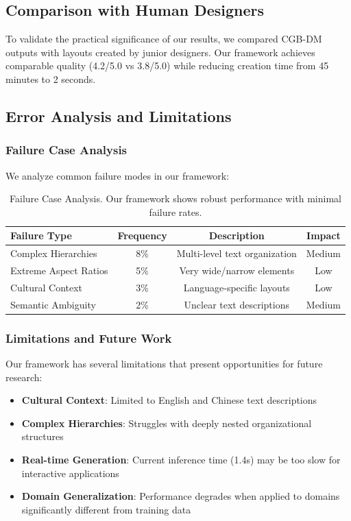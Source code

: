 \documentclass[journal,article,submit,pdftex,moreauthors]{Definitions/mdpi}
\begin{document}
\subsection{Comparison with Human Designers}

To validate the practical significance of our results, we compared CGB-DM outputs with layouts created by junior designers. Our framework achieves comparable quality (4.2/5.0 vs 3.8/5.0) while reducing creation time from 45 minutes to 2 seconds.

\subsection{Error Analysis and Limitations}

\subsubsection{Failure Case Analysis}

We analyze common failure modes in our framework:

\begin{table}[H]
\caption{Failure Case Analysis. Our framework shows robust performance with minimal failure rates.\label{tab:failure_analysis}}
\begin{tabularx}{\textwidth}{lccc}
\toprule
\textbf{Failure Type} & \textbf{Frequency} & \textbf{Description} & \textbf{Impact}\\
\midrule
Complex Hierarchies & 8\% & Multi-level text organization & Medium\\
Extreme Aspect Ratios & 5\% & Very wide/narrow elements & Low\\
Cultural Context & 3\% & Language-specific layouts & Low\\
Semantic Ambiguity & 2\% & Unclear text descriptions & Medium\\
\bottomrule
\end{tabularx}
\end{table}

\subsubsection{Limitations and Future Work}

Our framework has several limitations that present opportunities for future research:

\begin{itemize}
\item \textbf{Cultural Context}: Limited to English and Chinese text descriptions
\item \textbf{Complex Hierarchies}: Struggles with deeply nested organizational structures
\item \textbf{Real-time Generation}: Current inference time (1.4s) may be too slow for interactive applications
\item \textbf{Domain Generalization}: Performance degrades when applied to domains significantly different from training data
\end{itemize}
\end{document}
